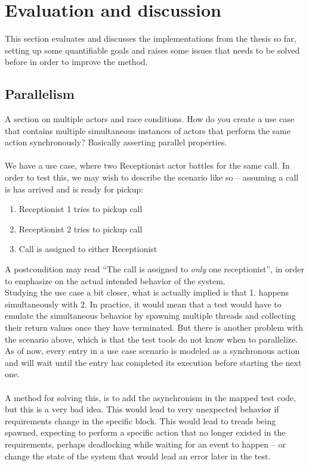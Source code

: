 \chapter{Evaluation and discussion}
This section evaluates and discusses the implementations from the thesis so far, setting up some quantifiable goals and raises some issues that needs to be solved before in order to improve the method.
\section{Parallelism}
A section on multiple actors and race conditions. How do you create a use case that contains multiple simultaneous instances of actors that perform the same action synchronously? Basically asserting parallel properties.\\\\
We have a use case, where two Receptionist actor battles for the same call. In order to test this, we may wish to describe the scenario like so -- assuming a call is has arrived and is ready for pickup:
\begin{enumerate}
 \item Receptionist 1 tries to pickup call
 \item Receptionist 2 tries to pickup call
 \item Call is assigned to either Receptionist
\end{enumerate}
A postcondition may read ``The call is assigned to \emph{only} one receptionist'', in order to emphasize on the actual intended behavior of the system.\\
Studying the use case a bit closer, what is actually implied is that 1. happens simultaneously with 2. In practice, it would mean that a test would have to emulate the simultaneous behavior by spawning multiple threads and collecting their return values once they have terminated. But there is another problem with the scenario above, which is that the test tools do not know when to parallelize. As of now, every entry in a use case scenario is modeled as a synchronous action and will wait until the entry has completed its execution before starting the next one.\\\\
A method for solving this, is to add the asynchronism in the mapped test code, but this is a very bad idea. This would lead to very unexpected behavior if requirements change in the specific block. This would lead to treads being spawned, expecting to perform a specific action that no longer existed in the requirements, perhaps deadlocking while waiting for an event to happen -- or change the state of the system that would lead an error later in the test.\\
